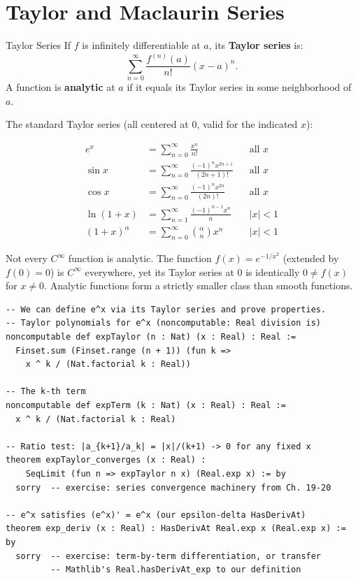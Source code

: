 \documentclass[12pt, openany]{book}
\theoremstyle{plain}
\theoremstyle{definition}
\theoremstyle{remark}
\begin{document}
\chapter{Taylor and Maclaurin Series}
\color{black}

\begin{defbox}{Taylor Series}
If $f$ is infinitely differentiable at $a$, its \textbf{Taylor series} is:
\[ \sum_{n=0}^\infty \frac{f^{(n)}(a)}{n!}(x-a)^n. \]
A function is \textbf{analytic} at $a$ if it equals its Taylor series in some neighborhood of $a$.
\end{defbox}
\color{black}

The standard Taylor series (all centered at $0$, valid for the indicated $x$):

\begin{align*}
  e^x &= \sum_{n=0}^\infty \frac{x^n}{n!} & &\text{all }x \\
  \sin x &= \sum_{n=0}^\infty \frac{(-1)^n x^{2n+1}}{(2n+1)!} & &\text{all }x \\
  \cos x &= \sum_{n=0}^\infty \frac{(-1)^n x^{2n}}{(2n)!} & &\text{all }x \\
  \ln(1+x) &= \sum_{n=1}^\infty \frac{(-1)^{n-1} x^n}{n} & &|x| < 1 \\
  (1+x)^\alpha &= \sum_{n=0}^\infty \binom{\alpha}{n} x^n & &|x| < 1
\end{align*}

\begin{remarkbox}
Not every $C^\infty$ function is analytic. The function $f(x) = e^{-1/x^2}$ (extended by $f(0) = 0$) is $C^\infty$ everywhere, yet its Taylor series at $0$ is identically $0 \neq f(x)$ for $x \neq 0$. Analytic functions form a strictly smaller class than smooth functions.
\end{remarkbox}
\color{black}

\begin{leanbox}
\begin{lstlisting}
-- We can define e^x via its Taylor series and prove properties.
-- Taylor polynomials for e^x (noncomputable: Real division is)
noncomputable def expTaylor (n : Nat) (x : Real) : Real :=
  Finset.sum (Finset.range (n + 1)) (fun k =>
    x ^ k / (Nat.factorial k : Real))

-- The k-th term
noncomputable def expTerm (k : Nat) (x : Real) : Real :=
  x ^ k / (Nat.factorial k : Real)

-- Ratio test: |a_{k+1}/a_k| = |x|/(k+1) -> 0 for any fixed x
theorem expTaylor_converges (x : Real) :
    SeqLimit (fun n => expTaylor n x) (Real.exp x) := by
  sorry  -- exercise: series convergence machinery from Ch. 19-20

-- e^x satisfies (e^x)' = e^x (our epsilon-delta HasDerivAt)
theorem exp_deriv (x : Real) : HasDerivAt Real.exp x (Real.exp x) := by
  sorry  -- exercise: term-by-term differentiation, or transfer
         -- Mathlib's Real.hasDerivAt_exp to our definition
\end{lstlisting}
\end{leanbox}
\color{black}
\end{document}
